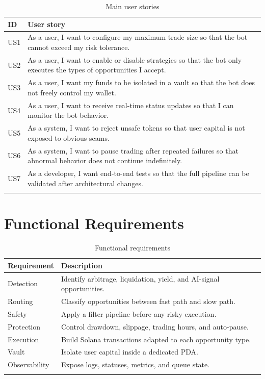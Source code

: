\documentclass[12pt,a4paper]{report}
\begin{document}
\begin{longtable}{p{1.5cm}p{11.8cm}}
\toprule
\textbf{ID} & \textbf{User story} \\
\midrule
US1 & As a user, I want to configure my maximum trade size so that the bot cannot exceed my risk tolerance. \\
US2 & As a user, I want to enable or disable strategies so that the bot only executes the types of opportunities I accept. \\
US3 & As a user, I want my funds to be isolated in a vault so that the bot does not freely control my wallet. \\
US4 & As a user, I want to receive real-time status updates so that I can monitor the bot behavior. \\
US5 & As a system, I want to reject unsafe tokens so that user capital is not exposed to obvious scams. \\
US6 & As a system, I want to pause trading after repeated failures so that abnormal behavior does not continue indefinitely. \\
US7 & As a developer, I want end-to-end tests so that the full pipeline can be validated after architectural changes. \\
\bottomrule
\caption{Main user stories}
\label{tab:user_stories}
\end{longtable}

\section{Functional Requirements}

\begin{longtable}{p{4cm}p{10cm}}
\toprule
\textbf{Requirement} & \textbf{Description} \\
\midrule
Detection & Identify arbitrage, liquidation, yield, and AI-signal opportunities. \\
Routing & Classify opportunities between fast path and slow path. \\
Safety & Apply a filter pipeline before any risky execution. \\
Protection & Control drawdown, slippage, trading hours, and auto-pause. \\
Execution & Build Solana transactions adapted to each opportunity type. \\
Vault & Isolate user capital inside a dedicated PDA. \\
Observability & Expose logs, statuses, metrics, and queue state. \\
\bottomrule
\caption{Functional requirements}
\end{longtable}
\end{document}
